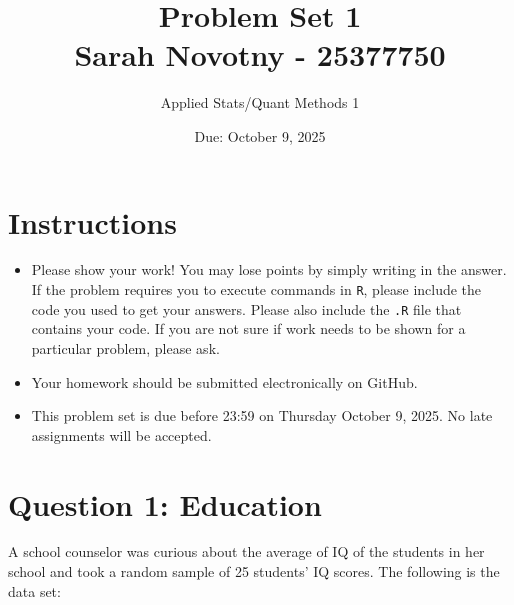 \documentclass[12pt,letterpaper]{article}
\title{Problem Set 1\\
\large Sarah Novotny - 25377750}
\date{Due: October 9, 2025}
\author{Applied Stats/Quant Methods 1}
\begin{document}
	\maketitle
	
	\section*{Instructions}
	\begin{itemize}
	\item Please show your work! You may lose points by simply writing in the answer. If the problem requires you to execute commands in \texttt{R}, please include the code you used to get your answers. Please also include the \texttt{.R} file that contains your code. If you are not sure if work needs to be shown for a particular problem, please ask.
\item Your homework should be submitted electronically on GitHub.
\item This problem set is due before 23:59 on Thursday October 9, 2025. No late assignments will be accepted.
	\end{itemize}
	
	\vspace{1cm}
	\section*{Question 1: Education}

A school counselor was curious about the average of IQ of the students in her school and took a random sample of 25 students' IQ scores. The following is the data set:\\
\vspace{.5cm}

  

\vspace{1cm}
\end{document}
